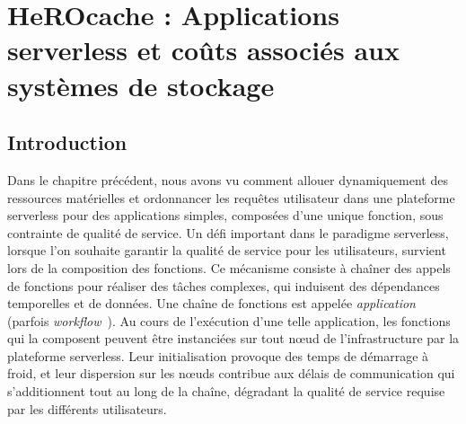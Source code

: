 \chapter{HeROcache : Applications serverless et coûts associés aux systèmes de stockage}
\label{chapter:herocache}


\section{Introduction}
\label{section:herocache-introduction}

Dans le chapitre précédent, nous avons vu comment allouer dynamiquement des ressources matérielles et ordonnancer les requêtes utilisateur dans une plateforme serverless pour des applications simples, composées d'une unique fonction, sous contrainte de qualité de service. Un défi important dans le paradigme serverless, lorsque l'on souhaite garantir la qualité de service pour les utilisateurs, survient lors de la composition des fonctions. Ce mécanisme consiste à chaîner des appels de fonctions pour réaliser des tâches complexes, qui induisent des dépendances temporelles et de données. Une chaîne de fonctions est appelée \textit{application} (parfois \textit{workflow}~\cite{burckhardtNetheriteEfficientExecution}). Au cours de l'exécution d'une telle application, les fonctions qui la composent peuvent être instanciées sur tout nœud de l'infrastructure par la plateforme serverless. Leur initialisation provoque des temps de démarrage à froid, et leur dispersion sur les nœuds contribue aux délais de communication qui s'additionnent tout au long de la chaîne, dégradant la qualité de service requise par les différents utilisateurs.


